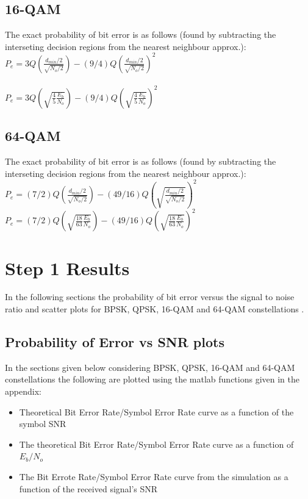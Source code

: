 \documentclass[]{article}
\begin{document}
\subsection{16-QAM}
\label{sec:qam16}

The exact probability of bit error is as follows (found by subtracting the interseting decision regions from the nearest neighbour approx.):\\

$ P_e = 3Q(\frac{d_{min}/2}{\sqrt{N_o/2}})-(9/4)Q(\frac{d_{min}/2}{\sqrt{N_o/2}})^2$ \\
\\
$ P_e = 3Q(\sqrt{\frac{4}{5}\frac{E_b}{N_o}})-(9/4)Q(\sqrt{\frac{4}{5}\frac{E_{b}}{N_o}})^2$  \\

\subsection{64-QAM}
\label{sec:qam64}
The exact probability of bit error is as follows (found by subtracting the interseting decision regions from the nearest neighbour approx.):\\

$P_e = (7/2)Q(\frac{d_{min}/2}{\sqrt{N_o/2}}) -(49/16)Q(\sqrt{\frac{d_{min}/2}{\sqrt{N_o/2}}})^2$ \\

$P_e = (7/2)Q(\sqrt{\frac{18}{63}\frac{E_b}{N_o}})-(49/16)Q(\sqrt{\frac{18}{63}\frac{E_b}{N_o}})^2$ \\



\section{Step 1 Results}

In the following sections the probability of bit error versus the signal to noise ratio and scatter plots for BPSK, QPSK, 16-QAM and 64-QAM constellations .

\subsection{Probability of Error vs SNR plots}
In the sections given below considering BPSK, QPSK, 16-QAM and 64-QAM constellations the following  are plotted using the matlab functions given in the appendix:
\begin{itemize}
\item Theoretical Bit Error Rate/Symbol Error Rate curve as a function of the symbol SNR
\item The theoretical Bit Error Rate/Symbol Error Rate curve as a function of $E_b/N_o$
\item The Bit Errote Rate/Symbol Error Rate curve from the simulation as a function of the received signal's SNR
\end{itemize}
\end{document}
